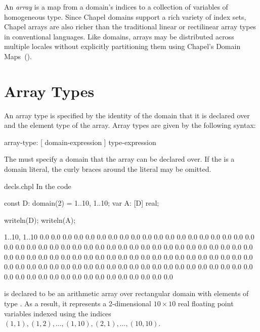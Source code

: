 \label{Arrays}

An \emph{array} is a map from a domain's indices to a collection of
variables of homogeneous type.  Since Chapel domains support a rich
variety of index sets, Chapel arrays are also richer than the
traditional linear or rectilinear array types in conventional
languages.  Like domains, arrays may be distributed across multiple
locales without explicitly partitioning them using Chapel's Domain
Maps~().


\section{Array Types}
\label{Array_Types}

An array type is specified by the identity of the domain that it is
declared over and the element type of the array.  Array types are
given by the following syntax:

\begin{syntax}
array-type:
  [ domain-expression ] type-expression
\end{syntax}
The  must specify a domain that the array can
be declared over.  If the  is a domain
literal, the curly braces around the literal may be omitted.

\begin{chapelexample}{decls.chpl}
In the code
\begin{chapel}
const D: domain(2) = {1..10, 1..10};
var A: [D] real;
\end{chapel}
\begin{chapelpost}
writeln(D);
writeln(A);
\end{chapelpost}
\begin{chapeloutput}
{1..10, 1..10}
0.0 0.0 0.0 0.0 0.0 0.0 0.0 0.0 0.0 0.0
0.0 0.0 0.0 0.0 0.0 0.0 0.0 0.0 0.0 0.0
0.0 0.0 0.0 0.0 0.0 0.0 0.0 0.0 0.0 0.0
0.0 0.0 0.0 0.0 0.0 0.0 0.0 0.0 0.0 0.0
0.0 0.0 0.0 0.0 0.0 0.0 0.0 0.0 0.0 0.0
0.0 0.0 0.0 0.0 0.0 0.0 0.0 0.0 0.0 0.0
0.0 0.0 0.0 0.0 0.0 0.0 0.0 0.0 0.0 0.0
0.0 0.0 0.0 0.0 0.0 0.0 0.0 0.0 0.0 0.0
0.0 0.0 0.0 0.0 0.0 0.0 0.0 0.0 0.0 0.0
0.0 0.0 0.0 0.0 0.0 0.0 0.0 0.0 0.0 0.0
\end{chapeloutput}
 is declared to be an arithmetic array over rectangular
domain  with elements of type .  As a result, it
represents a 2-dimensional $10 \times 10$ real floating point
variables indexed using the indices $(1, 1), (1, 2), \ldots, (1, 10),
(2, 1), \ldots, (10, 10)$.
\end{chapelexample}

